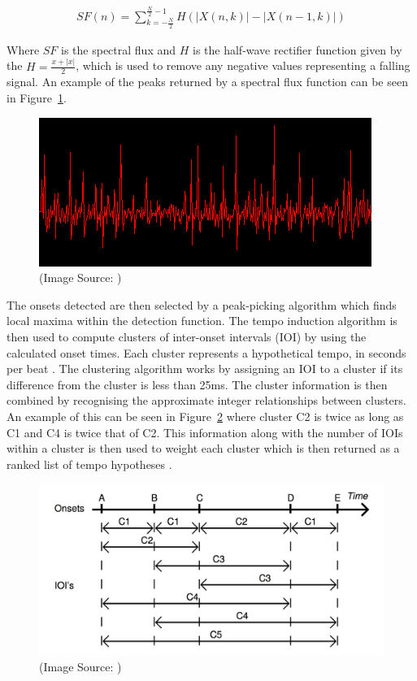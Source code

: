 \documentclass[a4paper, 11pt]{article}
\begin{document}
\begin{equation}
\begin{split}
SF(n) = \sum_{k=-\frac{N}{2}}^{\frac{N}{2}-1} H(|X(n,k)| - |X(n-1, k)|)
\end{split}
\end{equation}

Where $SF$ is the spectral flux and $H$ is the half-wave rectifier function given by the $H=\frac{x+|x|}{2}$, which is used to remove any negative values representing a falling signal. An example of the peaks returned by a spectral flux function can be seen in Figure~\ref{fig: spec-flux}.

\begin{figure}[ht]
	\centering
	\includegraphics[scale=0.5]{images/spectralflux.png}
	\caption{(Image Source: \cite{badlogic})}
	\label{fig: spec-flux}
\end{figure}

The onsets detected are then selected by a peak-picking algorithm which finds local maxima within the detection function. The tempo induction algorithm is then used to compute clusters of inter-onset intervals (IOI) by using the calculated onset times. Each cluster represents a hypothetical tempo, in seconds per beat \cite{dixon1}. The clustering algorithm works by assigning an IOI to a cluster if its difference from the cluster is less than 25ms. The cluster information is then combined by recognising the approximate integer relationships between clusters. An example of this can be seen in Figure~\ref{fig: br-clusters} where cluster C2 is twice as long as C1 and C4 is twice that of C2. This information along with the number of IOIs within a cluster is then used to weight each cluster which is then returned as a ranked list of tempo hypotheses \cite{dixon4}.

\begin{figure}[ht]
	\centering
	\includegraphics[scale=0.25]{br-clusters}
	\caption{(Image Source: \cite{dixon4})}
	\label{fig: br-clusters}
\end{figure}
\end{document}
